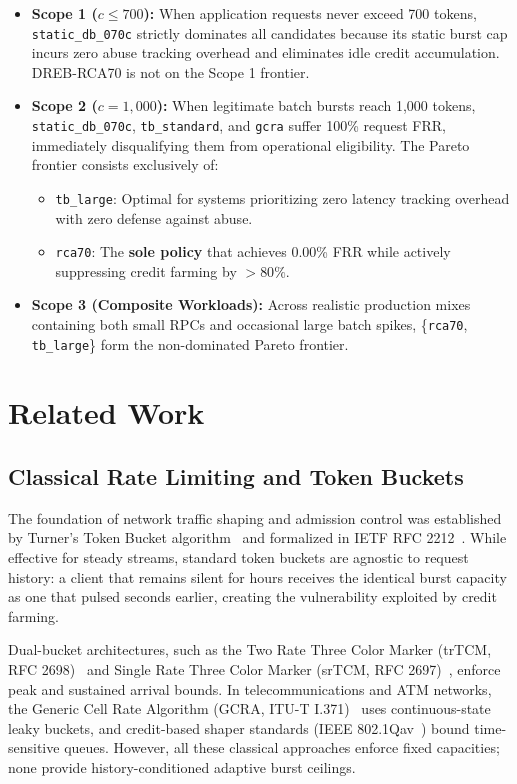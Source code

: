 \documentclass[conference]{IEEEtran}
\begin{document}
\begin{itemize}
    \item \textbf{Scope 1 ($c \le 700$):} When application requests never exceed 700 tokens, \texttt{static\_db\_070c} strictly dominates all candidates because its static burst cap incurs zero abuse tracking overhead and eliminates idle credit accumulation. DREB-RCA70 is not on the Scope 1 frontier.
    \item \textbf{Scope 2 ($c = 1,000$):} When legitimate batch bursts reach 1,000 tokens, \texttt{static\_db\_070c}, \texttt{tb\_standard}, and \texttt{gcra} suffer 100\% request FRR, immediately disqualifying them from operational eligibility. The Pareto frontier consists exclusively of:
    \begin{itemize}
        \item \texttt{tb\_large}: Optimal for systems prioritizing zero latency tracking overhead with zero defense against abuse.
        \item \texttt{rca70}: The \textbf{sole policy} that achieves 0.00\% FRR while actively suppressing credit farming by $>80\%$.
    \end{itemize}
    \item \textbf{Scope 3 (Composite Workloads):} Across realistic production mixes containing both small RPCs and occasional large batch spikes, \{\texttt{rca70}, \texttt{tb\_large}\} form the non-dominated Pareto frontier.
\end{itemize}

\section{Related Work}

\subsection{Classical Rate Limiting and Token Buckets}
The foundation of network traffic shaping and admission control was established by Turner's Token Bucket algorithm~\cite{turner1986new} and formalized in IETF RFC 2212~\cite{rfc2212}. While effective for steady streams, standard token buckets are agnostic to request history: a client that remains silent for hours receives the identical burst capacity as one that pulsed seconds earlier, creating the vulnerability exploited by credit farming.

Dual-bucket architectures, such as the Two Rate Three Color Marker (trTCM, RFC 2698)~\cite{rfc2698} and Single Rate Three Color Marker (srTCM, RFC 2697)~\cite{rfc2697}, enforce peak and sustained arrival bounds. In telecommunications and ATM networks, the Generic Cell Rate Algorithm (GCRA, ITU-T I.371)~\cite{itu1996i371} uses continuous-state leaky buckets, and credit-based shaper standards (IEEE 802.1Qav~\cite{ieee8021qav}) bound time-sensitive queues. However, all these classical approaches enforce fixed capacities; none provide history-conditioned adaptive burst ceilings.
\end{document}
